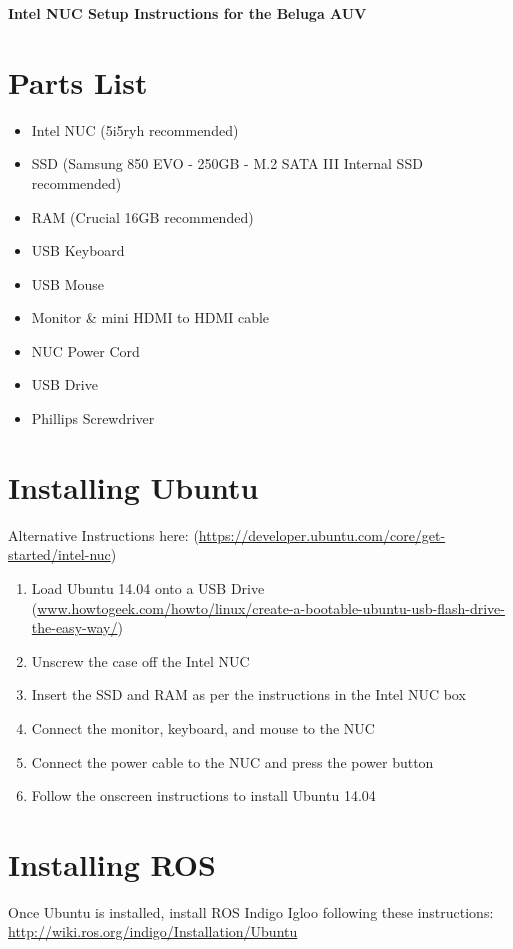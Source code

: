 \documentclass{article}
\begin{document}
\begin{center}
\Large\bf Intel NUC Setup Instructions for the Beluga AUV
\end{center}

\section*{Parts List}
\begin{itemize}[nosep]
    \item Intel NUC (5i5ryh recommended)
    \item SSD (Samsung 850 EVO - 250GB - M.2 SATA III Internal SSD recommended)
    \item RAM (Crucial 16GB recommended)
    \item USB Keyboard
    \item USB Mouse
    \item Monitor \& mini HDMI to HDMI cable
    \item NUC Power Cord
    \item USB Drive
    \item Phillips Screwdriver
\end{itemize}

\section*{Installing Ubuntu}
Alternative Instructions here: (\url{https://developer.ubuntu.com/core/get-started/intel-nuc})
\begin{enumerate}[nosep]
    \item Load Ubuntu 14.04 onto a USB Drive \\ (\url{www.howtogeek.com/howto/linux/create-a-bootable-ubuntu-usb-flash-drive-the-easy-way/})
    \item Unscrew the case off the Intel NUC
    \item Insert the SSD and RAM as per the instructions in the Intel NUC box
    \item Connect the monitor, keyboard, and mouse to the NUC
    \item Connect the power cable to the NUC and press the power button
    \item Follow the onscreen instructions to install Ubuntu 14.04
\end{enumerate}

\section*{Installing ROS}
Once Ubuntu is installed, install ROS Indigo Igloo following these instructions: \url{http://wiki.ros.org/indigo/Installation/Ubuntu}
\end{document}

